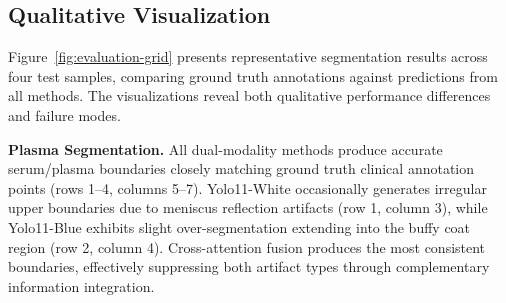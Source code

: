 \documentclass[journal,twoside,web]{ieeecolor}
\begin{document}
\begin{figure*}[!t]
\noindent
{}\hspace{\sepSa}%
\hspace{\sepLa}%
\hspace{\sepSa}%
\hspace{\sepSa}%
%
%
%
\caption{Demonstrations of segmentation results from different models for the Blood Fractionation Component Segmentation task. In the figure, from top to bottom, the components are plasma, buffy coat, and red blood cell, respectively. From the third column, yellow, green, and blue points represent the segmented regions for each class. The regions outlined by white contours are the boundaries formed by the respective methods. From left to right, the columns display the following: original photos for the testing tube, ground truth annotated by professional blood testing personnel, Yolo11-White result, Yolo11-Blue result, Dual Yolo Channel Concatenation Fusion result, Dual Yolo Adaptive Weighted Fusion result, and Dual Yolo Cross Attention result.}
\label{fig:evaluation-grid}
\end{figure*}

\subsection{Qualitative Visualization}

Figure~\ref{fig:evaluation-grid} presents representative segmentation results across four test samples, comparing ground truth annotations against predictions from all methods. The visualizations reveal both qualitative performance differences and failure modes.

\textbf{Plasma Segmentation.} All dual-modality methods produce accurate serum/plasma boundaries closely matching ground truth clinical annotation points (rows 1--4, columns 5--7). Yolo11-White occasionally generates irregular upper boundaries due to meniscus reflection artifacts (row 1, column 3), while Yolo11-Blue exhibits slight over-segmentation extending into the buffy coat region (row 2, column 4). Cross-attention fusion produces the most consistent boundaries, effectively suppressing both artifact types through complementary information integration.
\end{document}
